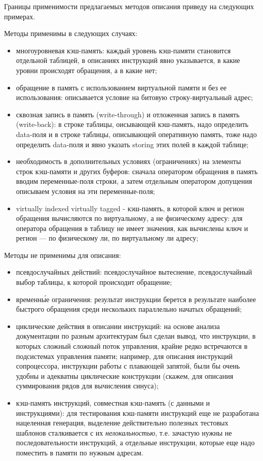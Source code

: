 \documentclass[14pt]{extreport}
\begin{document}
Границы применимости предлагаемых методов описания приведу на следующих
примерах.

Методы применимы в следующих случаях:
\begin{itemize}
    \item многоуровневая кэш-память: каждый уровень кэш-памяти становится
отдельной таблицей, в описаниях инструкций явно указывается, в какие уровни
происходят обращения, а в какие нет;
    \item обращение в память с использованием виртуальной памяти и без ее
использования: описывается условие на битовую строку-виртуальный адрес;
    \item сквозная запись в память (write-through) и отложенная запись в память
(write-back): в строке таблицы, оисывающей кэш-память, надо определить data-поля
и в строке таблицы, описывающей оперативную память, тоже надо определить
data-поля и явно указать storing этих полей в каждой таблице;
    \item необходимость в дополнительных условиях (ограничениях) на элементы
строк кэш-памяти и других буферов: сначала оператором обращения в память вводим
переменные-поля строки, а затем отдельным оператором допущения описываем условия
на эти переменные-поля;
    \item virtually indexed virtually tagged - кэш-память, в которой ключ и
регион обращения вычисляются по виртуальному, а не физическому адресу: для
оператора обращения в таблицу не имеет значения, как вычислены ключ и регион ---
по физическому ли, по виртуальному ли адресу;
\end{itemize}


Методы не применимы для описания:
\begin{itemize}
    \item псевдослучайных действий: псевдослучайное вытеснение, псевдослучайный
выбор таблицы, к которой происходит обращение;
    \item временн\'{ы}е ограничения: результат инструкции берется в результате
наиболее быстрого обращения среди нескольких параллельно начатых обращений;
    \item циклические действия в описании инструкций: на основе анализа
документации по разным архитектурам был сделан вывод, что инструкции, в которых
сложный сложный поток управления, крайне редко встречаются в подсистемах
управления памяти; например, для описания инструкций сопроцессора, инструкции
работы с плавающей запятой, были бы очень удобны и адекватны циклические
конструкции (скажем, для описания суммирования рядов для вычисления синуса);
    \item кэш-память инструкций, совместная кэш-память (с данными и
инструкциями): для тестирования кэш-памяти инструкций еще не разработана
нацеленная генерация, выделение действительно полезных тестовых шаблонов
сталкивается с их \emph{нелокальностью}, т.е. зачастую нужны не
последовательности инструкций, а отдельные инструкции, которые еще надо
поместить в памяти по нужным адресам.
\end{itemize}
\end{document}

